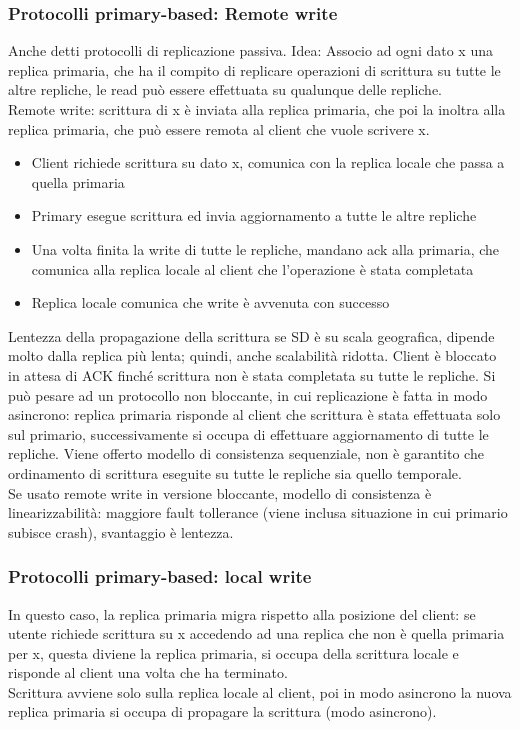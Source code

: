 \documentclass[16px]{article}
\begin{document}
\subsubsection{Protocolli primary-based: Remote write}
Anche detti protocolli di replicazione passiva. Idea:
Associo ad ogni dato x una replica primaria, che ha il compito di replicare operazioni di scrittura su tutte le altre repliche, le read può essere effettuata su qualunque delle repliche.\\ Remote write: scrittura di x è inviata alla replica primaria, che poi la inoltra alla replica primaria, che può essere remota al client che vuole scrivere x.
\begin{itemize}
\item Client richiede scrittura su dato x, comunica con la replica locale che passa a quella primaria
\item Primary esegue scrittura ed invia aggiornamento a tutte le altre repliche
\item Una volta finita la write di tutte le repliche, mandano ack alla primaria, che comunica alla replica locale al client che l'operazione è stata completata
\item Replica locale comunica che write è avvenuta con successo
\end{itemize}
Lentezza della propagazione della scrittura se SD è su scala geografica, dipende molto dalla replica più lenta; quindi, anche scalabilità ridotta. Client è bloccato in attesa di ACK finché scrittura non è stata completata su tutte le repliche. Si può pesare ad un protocollo non bloccante, in cui replicazione è fatta in modo asincrono: replica primaria risponde al client che scrittura è stata effettuata solo sul primario, successivamente si occupa di effettuare aggiornamento di tutte le repliche. Viene offerto modello di consistenza sequenziale, non è garantito che ordinamento di scrittura eseguite su tutte le repliche sia quello temporale.\\ Se usato remote write in versione bloccante, modello di consistenza è linearizzabilità: maggiore fault tollerance (viene inclusa situazione in cui primario subisce crash), svantaggio è lentezza.
\subsubsection{Protocolli primary-based: local write}
In questo caso, la replica primaria migra rispetto alla posizione del client: se utente richiede scrittura su x accedendo ad una replica che non è quella primaria per x, questa diviene la replica primaria, si occupa della scrittura locale e risponde al client una volta che ha terminato.\\ Scrittura avviene solo sulla replica locale al client, poi in modo asincrono la nuova replica primaria si occupa di propagare la scrittura (modo asincrono).
\end{document}
